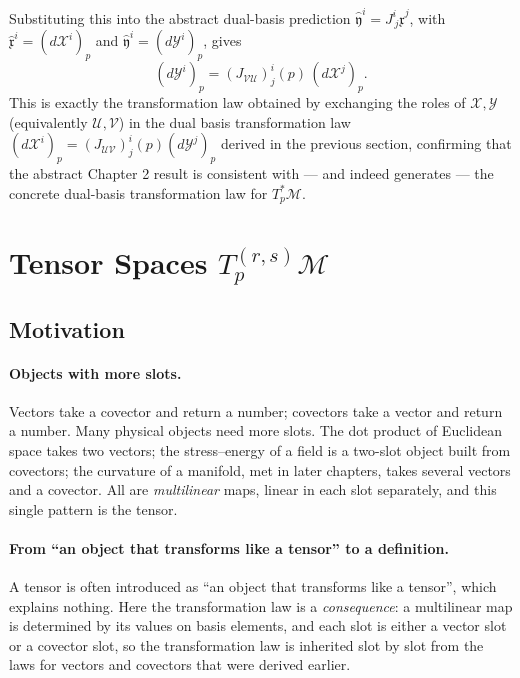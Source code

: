 \documentclass[11pt]{article}
\begin{document}
Substituting this into the abstract dual-basis prediction
$\hat{\mathfrak y}^i= J^i_{\,j}\hat{\mathfrak x}^j$, with
$\hat{\mathfrak x}^i=(d\mathcal X^i)_p$ and $\hat{\mathfrak y}^i=(d\mathcal
Y^i)_p$, gives
\[
(d\mathcal Y^i)_p = (J_{\mathcal{VU}})^i_j(p)\,(d\mathcal
X^j)_p.
\]
This is exactly the transformation law obtained by exchanging the roles of
$\mathcal X,\mathcal Y$ (equivalently $\mathcal U,\mathcal V$) in the dual
basis transformation law $(d\mathcal X^i)_p=(J_{\mathcal{UV}})^i_j(p)
(d\mathcal Y^j)_p$ derived in the previous section, confirming that the
abstract Chapter 2 result is consistent with — and indeed generates — the
concrete dual-basis transformation law for $T_p^*\mathcal M$.

\section{Tensor Spaces $T_p^{(r,s)}\mathcal M$}

\subsection*{Motivation}

\paragraph{Objects with more slots.}
Vectors take a covector and return a number; covectors take a vector and return a number. Many physical objects need more slots. The dot product of Euclidean space takes two vectors; the stress--energy of a field is a two-slot object built from covectors; the curvature of a manifold, met in later chapters, takes several vectors and a covector. All are \emph{multilinear} maps, linear in each slot separately, and this single pattern is the tensor.

\paragraph{From ``an object that transforms like a tensor'' to a definition.}
A tensor is often introduced as ``an object that transforms like a tensor'', which explains nothing. Here the transformation law is a \emph{consequence}: a multilinear map is determined by its values on basis elements, and each slot is either a vector slot or a covector slot, so the transformation law is inherited slot by slot from the laws for vectors and covectors that were derived earlier.
\end{document}
